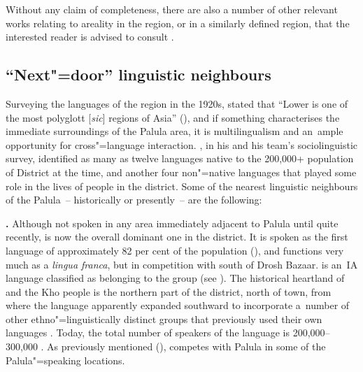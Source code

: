 Without any claim of completeness, there are also a number of other relevant works relating to areality in the region, or in a similarly defined region, that the interested reader is advised to consult \citep{bashir1988,bashir1996b,edelman1980,edelman1983,fussman1972,skalmowski1974,tikkanen1999,toporov1970}.


\subsection{``Next"=door'' linguistic neighbours}
\label{subsec:1-3-3}

Surveying the languages of the region in the 1920s, \citeauthor{morgenstierne1941} stated that ``Lower \iliChitral is one of the most polyglott [\textit{sic}] regions of Asia'' (\citeyear[7]{morgenstierne1941}), and if something characterises the immediate surroundings of the Palula area, it is multilingualism and an~ample opportunity for cross"=language interaction. \citet[10--23]{decker1992a}, in his and his team's sociolinguistic survey, identified as many as twelve languages native to the 200,000+ population of \iliChitral District at the time, and another four non"=native languages that played some role in the lives of people in the district. Some of the nearest linguistic neighbours of the Palula~-- historically or presently~-- are the following:


\textbf{\iliKhowar [khw].}
Although not spoken in any area immediately adjacent to Palula until quite recently, \iliKhowar is now the overall dominant one in the district. It is spoken as the first language of approximately 82 per cent of the population (\citealt[11]{decker1992a}), and functions very much as a \textit{lingua franca}, but in competition with \iliPashto south of Drosh Bazaar. \iliKhowar is an~IA language classified as belonging to the \iliChitral group (see ). The historical heartland of \iliKhowar and the Kho people is the northern part of the \iliChitral district, north of \iliChitral town, from where the language apparently expanded southward to incorporate a~number of other ethno"=linguistically distinct groups that previously used their own languages \citep[46--47]{morgenstierne1932}. Today, the total number of speakers of the language is 200,000--300,000 \citep[31--32]{decker1992a}. As previously mentioned (), \iliKhowar competes with Palula in some of the Palula"=speaking locations.



